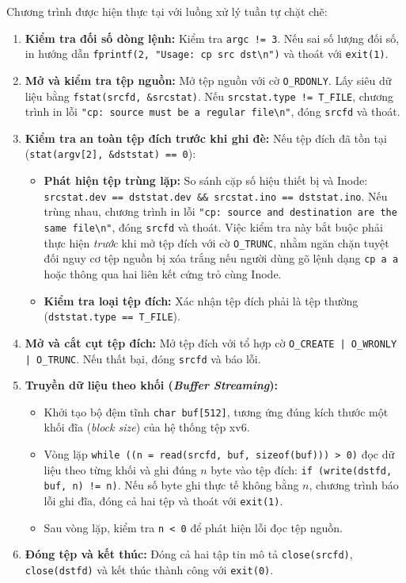 \documentclass[12pt,a4paper]{article}
\begin{document}
Chương trình được hiện thực tại  với luồng xử lý tuần tự chặt chẽ:
\begin{enumerate}
  \item \textbf{Kiểm tra đối số dòng lệnh:} Kiểm tra \texttt{argc != 3}. Nếu sai số lượng đối số, in hướng dẫn \texttt{fprintf(2, "Usage: cp src dst\textbackslash n")} và thoát với \texttt{exit(1)}.
  \item \textbf{Mở và kiểm tra tệp nguồn:} Mở tệp nguồn với cờ \texttt{O\_RDONLY}. Lấy siêu dữ liệu bằng \texttt{fstat(srcfd, \&srcstat)}. Nếu \texttt{srcstat.type != T\_FILE}, chương trình in lỗi \texttt{"cp: source must be a regular file\textbackslash n"}, đóng \texttt{srcfd} và thoát.
  \item \textbf{Kiểm tra an toàn tệp đích trước khi ghi đè:} Nếu tệp đích đã tồn tại (\texttt{stat(argv[2], \&dststat) == 0}):
  \begin{itemize}
    \item \textbf{Phát hiện tệp trùng lặp:} So sánh cặp số hiệu thiết bị và Inode: \texttt{srcstat.dev == dststat.dev \&\& srcstat.ino == dststat.ino}. Nếu trùng nhau, chương trình in lỗi \texttt{"cp: source and destination are the same file\textbackslash n"}, đóng \texttt{srcfd} và thoát. Việc kiểm tra này bắt buộc phải thực hiện \textit{trước} khi mở tệp đích với cờ \texttt{O\_TRUNC}, nhằm ngăn chặn tuyệt đối nguy cơ tệp nguồn bị xóa trắng nếu người dùng gõ lệnh dạng \texttt{cp a a} hoặc thông qua hai liên kết cứng trỏ cùng Inode.
    \item \textbf{Kiểm tra loại tệp đích:} Xác nhận tệp đích phải là tệp thường (\texttt{dststat.type == T\_FILE}).
  \end{itemize}
  \item \textbf{Mở và cắt cụt tệp đích:} Mở tệp đích với tổ hợp cờ \texttt{O\_CREATE | O\_WRONLY | O\_TRUNC}. Nếu thất bại, đóng \texttt{srcfd} và báo lỗi.
  \item \textbf{Truyền dữ liệu theo khối (\textit{Buffer Streaming}):}
  \begin{itemize}
    \item Khởi tạo bộ đệm tĩnh \texttt{char buf[512]}, tương ứng đúng kích thước một khối đĩa (\textit{block size}) của hệ thống tệp xv6.
    \item Vòng lặp \texttt{while ((n = read(srcfd, buf, sizeof(buf))) > 0)} đọc dữ liệu theo từng khối và ghi đúng $n$ byte vào tệp đích: \texttt{if (write(dstfd, buf, n) != n)}. Nếu số byte ghi thực tế không bằng $n$, chương trình báo lỗi ghi đĩa, đóng cả hai tệp và thoát với \texttt{exit(1)}.
    \item Sau vòng lặp, kiểm tra \texttt{n < 0} để phát hiện lỗi đọc tệp nguồn.
  \end{itemize}
  \item \textbf{Đóng tệp và kết thúc:} Đóng cả hai tập tin mô tả \texttt{close(srcfd)}, \texttt{close(dstfd)} và kết thúc thành công với \texttt{exit(0)}.
\end{enumerate}
\end{document}
